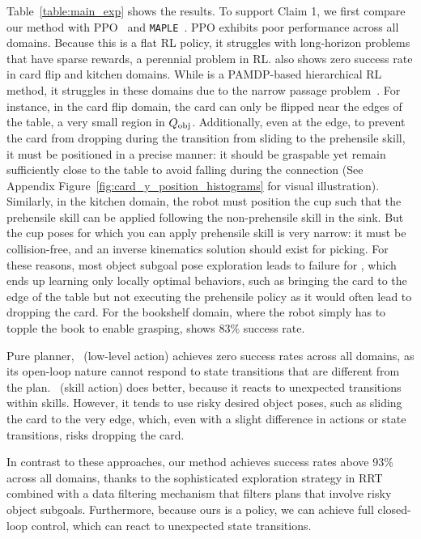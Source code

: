 Table~\ref{table:main_exp} shows the results.
To support Claim 1, we first compare our method with PPO~\cite{schulman2017proximal} and \texttt{MAPLE}~\cite{nasiriany2022augmenting}. PPO exhibits poor performance across all domains. Because this is a flat RL policy, it struggles with long-horizon problems that have sparse rewards, a perennial problem in RL. \maple{} also shows zero success rate in card flip and kitchen domains. While \maple{} is a PAMDP-based hierarchical RL method, it struggles in these domains due to the narrow passage problem~\cite{hsu1998finding}. For instance, in the card flip domain, the card can only be flipped near the edges of the table, a very small region in $Q_\text{obj}$. Additionally, even at the edge, to prevent the card from dropping during the transition from sliding to the prehensile skill, it must be positioned in a precise manner: it should be graspable yet remain sufficiently close to the table to avoid falling during the connection (See Appendix Figure~\ref{fig:card_y_position_histograms} for visual illustration).  Similarly, in the kitchen domain, the robot must position the cup such that the prehensile skill can be applied following the non-prehensile skill in the sink. But the cup poses for which you can apply prehensile skill is very narrow: it must be collision-free, and an inverse kinematics solution should exist for picking. For these reasons, most object subgoal pose exploration leads to failure for \maple{}, which ends up learning only locally optimal behaviors, such as bringing the card to the edge of the table but not executing the prehensile policy as it would often lead to dropping the card. For the bookshelf domain, where the robot simply has to topple the book to enable grasping, \maple{} shows 83\% success rate.


Pure planner, \skillrrt~(low-level action) achieves zero success rates across all domains, as its open-loop nature cannot respond to state transitions that are different from the plan. \skillrrt~(skill action) does better, because it reacts to unexpected transitions within skills. However, it tends to use risky desired object poses, such as sliding the card to the very edge, which, even with a slight difference in actions or state transitions, risks dropping the card.


In contrast to these approaches, our method achieves success rates above 93\% across all domains, thanks to the sophisticated exploration strategy in RRT combined with a data filtering mechanism that filters plans that involve risky object subgoals. Furthermore, because ours is a policy, we can achieve full closed-loop control, which can react to unexpected state transitions.




